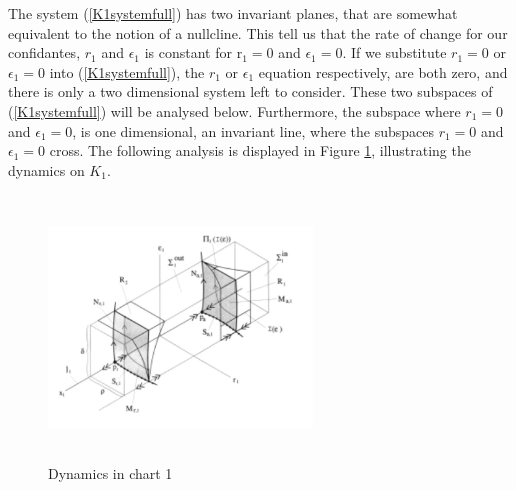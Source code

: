 The system (\ref{K1systemfull}) has two invariant planes, that are somewhat equivalent to the notion of a nullcline. This tell us that the rate of change for our confidantes, $ r_1 $ and $ \epsilon_1 $ is constant for r$ _1=0 $ and $\epsilon_1=0$. If we substitute $r_1=0$ or $\epsilon_1=0$ into (\ref{K1systemfull}), the $r_1$ or $\epsilon_1$ equation respectively, are both zero, and there is only a two dimensional system left to consider. These two subspaces of (\ref{K1systemfull}) will be analysed below. Furthermore, the subspace where $r_1=0$ and $\epsilon_1=0$, is one dimensional, an invariant line, where the subspaces $r_1=0$ and $\epsilon_1=0$ cross.
The following analysis is displayed in Figure \ref{fig:k1chart}, illustrating the dynamics on $K_1$.
\begin{figure}[h!]
	\centering
	\includegraphics[height=7cm,width=7cm]{Images/K1Chart}
	\caption{Dynamics in chart 1 \citep{krupa2001}}
		\label{fig:k1chart}
\end{figure}\newpage


